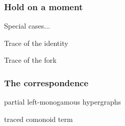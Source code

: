 \begin{frame}
    \frametitle{Hold on a moment}

    \centering
    \pause
    \LARGE
    \alert{Special cases...}

    \Large
    \pause
    \vspace{0.5em}

    Trace of the identity

    \vspace{0.5em}


    \vspace{0.5em}

    Trace of the fork

    \vspace{0.5em}

\end{frame}

\begin{frame}
    \frametitle{The correspondence}

    \centering

    \begin{minipage}{0.45\textwidth}
        \begin{center}
            partial left-monogamous hypergraphs
            \vspace{1em}

        \end{center}
    \end{minipage}
    \pause
    \quad
    \raisebox{-1em}{\(\leftrightarrow\)}
    \begin{minipage}{0.45\textwidth}
        \begin{center}
            traced comonoid term

            \vspace{1em}

        \end{center}
    \end{minipage}

    \pause
    \vspace{1.5em}

    \meanddan

\end{frame}